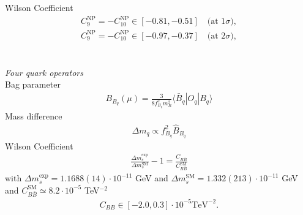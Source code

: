 Wilson Coefficient \cite{150306199} \cite{1608.07832}
\begin{align}
 C_9^\text{NP} = -C_{10}^\text{NP} \in [-0.81,-0.51]\quad \text{(at 1}\sigma), \label{eq_mumuBound1s}\\
 C_9^\text{NP} = -C_{10}^\text{NP} \in [-0.97,-0.37]\quad \text{(at 2}\sigma),
\end{align}
\\ \\ \textit{Four quark operators}\\
Bag parameter \cite{1607.00299}
\begin{align}
 B_{B_q}(\mu) = \frac{3}{8f_{B_q}^2 m_B^2} \langle \bar B_q |O_q|B_q \rangle
\end{align}
Mass difference \cite{1102.0009}
\begin{align}
 \Delta m_q \propto f^2_{B_q} \hat{B}_{B_q}
\end{align}
Wilson Coefficient
\begin{align}
 \frac{\Delta m_s^\text{exp}}{\Delta m_s^\text{SM}}-1 = \frac{C_{B\bar B}}{C^\text{SM}_{B\bar B}}
\end{align}
with $\Delta m_s^\text{exp} = 1.1688(14) \cdot 10^{-11}$ GeV \cite{PDG} \cite{1602.03560} and $\Delta m_s^\text{SM} = 1.332(213)\cdot 10^{-11}$ GeV \cite{0612167}%
and $C_{B\bar B}^\text{SM} \simeq 8.2\cdot 10^{-5}$ TeV$^{-2}$ 
\begin{align}
 C_{BB} \in [-2.0,0.3] \cdot 10^{-5} \text{TeV}^{-2}.%
 \label{eq_mixBound}
\end{align}




